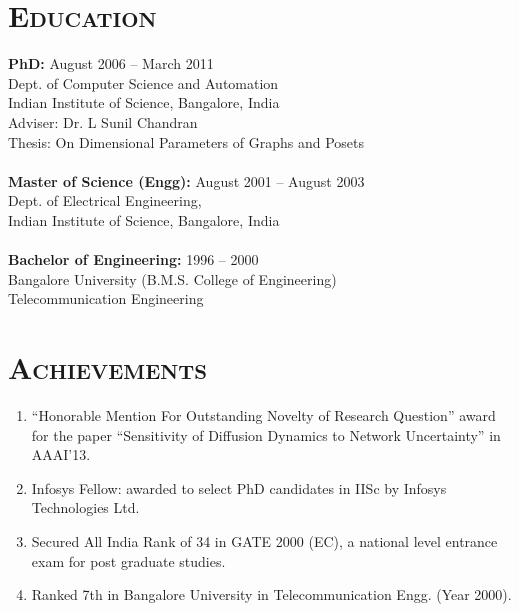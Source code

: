\documentclass[margin,10pt]{res} %
\begin{document}
\begin{resume}
\section{\textnormal{\textsc{Education}}}
\textbf{PhD:} \hfill August 2006 -- March 2011\\
Dept. of Computer Science and Automation\\
Indian Institute of Science, Bangalore, India\\ 
Adviser: {Dr. L Sunil Chandran}\\
{Thesis}: On Dimensional Parameters of Graphs and Posets\\
~\\
\noindent\textbf{Master of Science (Engg):} \hfill August 2001 -- August 2003\\
Dept. of Electrical Engineering,\\
Indian Institute of Science, Bangalore, India\\
~\\
\noindent\textbf{Bachelor of Engineering:} \hfill 1996 -- 2000\\
Bangalore University (B.M.S. College of Engineering)\\
Telecommunication Engineering
\section{\textnormal{\textsc{Achievements}}}
\begin{enumerate}[$\circ$]
\item ``Honorable Mention For Outstanding Novelty of Research
Question'' award for the paper ``Sensitivity of Diffusion Dynamics to
Network Uncertainty'' in AAAI'13.
\item Infosys Fellow: awarded to select
PhD candidates in IISc by Infosys Technologies Ltd. 
\item Secured All India Rank of 34 in GATE 2000 (EC), a national level
entrance exam for post graduate studies.
\item Ranked 7th in Bangalore University in Telecommunication Engg. (Year 2000).
\end{enumerate}

\end{resume}
\end{document}
